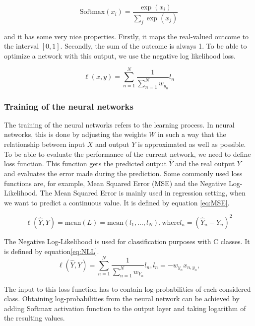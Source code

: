 \begin{equation}
    \text{Softmax}(x_{i}) = \frac{\exp(x_i)}{\sum_j \exp(x_j)}
\end{equation}

and it has some very nice properties.
Firstly, it maps the real-valued outcome to the interval $[0, 1]$.
Secondly, the sum of the outcome is always 1.
To be able to optimize a network with this output, we use the negative log likelihood loss.

\begin{equation}
    \ell(x, y) = \sum_{n=1}^N \frac{1}{\sum_{n=1}^N w_{y_n}} l_n 
\end{equation}

\subsubsection{Training of the neural networks}
The training of the neural networks refers to the learning process.
In neural networks, this is done by adjusting the weights $W$ in such a way that the relationship between input $X$ and output $Y$ is approximated as well as possible.
To be able to evaluate the performance of the current network, we need to define loss function.
This function gets the predicted output $\hat{Y}$ and the real output $Y$ and evaluates the error made during the prediction.
Some commonly used loss functions are, for example, Mean Squared Error (MSE) and the Negative Log-Likelihood.
The Mean Squared Error is mainly used in regression setting, when we want to predict a continuous value.
It is defined by equation \ref{eq:MSE}.

\begin{equation}
    \ell(\hat{Y}, Y) = \text{mean}(L) = \text{mean}(l_1,\dots,l_N), 
    \text{where} l_n = (\hat{Y}_n - Y_n)^2
    \label{eq:MSE}
\end{equation}

The Negative Log-Likelihood is used for classification purposes with C classes.
It is defined by equation\ref{eq:NLL}.
\begin{equation}
    \ell(\hat{Y}, Y) = \sum_{n=1}^N \frac{1}{\sum_{n=1}^N w_{Y_n}} l_n,
    l_n = - w_{y_n} x_{n,y_n},
    \label{eq:NLL}
\end{equation}

The input to this loss function has to contain log-probabilities of each considered class.
Obtaining log-probabilities from the neural network can be achieved by adding Softmax activation function to the output layer and taking logarithm of the resulting values.

